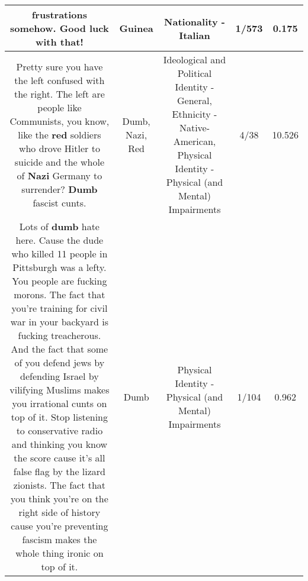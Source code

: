 \documentclass[11pt]{article}
\newlength\mylength
\begin{document}
\begin{center}
\begin{longtable}{|C{.65\mylength}|C{.30\mylength}|C{.12\mylength}|C{.12\mylength}|C{.12\mylength}|}
frustrations somehow. Good luck with that!\normalsize   & Guinea & Nationality - Italian & 1/573 & 0.175 \\  \hline
  \small Pretty sure you have the left confused with the right. The left are people like Communists, you know, like the \textbf{r\textbf{ed}} soldiers who drove Hitler to suicide and the whole of \textbf{Nazi} Germany to surrender? \textbf{Dumb} fascist cunts.\normalsize   & Dumb, Nazi, Red &  Ideological and Political Identity - General, Ethnicity - Native-American, Physical Identity - Physical (and Mental) Impairments & 4/38 & 10.526 \\  \hline
  \small Lots of \textbf{dumb} hate here. Cause the dude who killed 11 people in Pittsburgh was a lefty. You people are fucking morons. The fact that you're training for civil war in your backyard is fucking treacherous. And the fact that some of you defend jews by defending Israel by vilifying Muslims makes you irrational cunts on top of it. Stop listening to conservative radio and thinking you know the score cause it's all false flag by the lizard zionists. The fact that you think you're on the right side of history cause you're preventing fascism makes the whole thing ironic on top of it.\normalsize   & Dumb & Physical Identity - Physical (and Mental) Impairments & 1/104 & 0.962 \\  \hline

\end{longtable}
\end{center}
\end{document}
